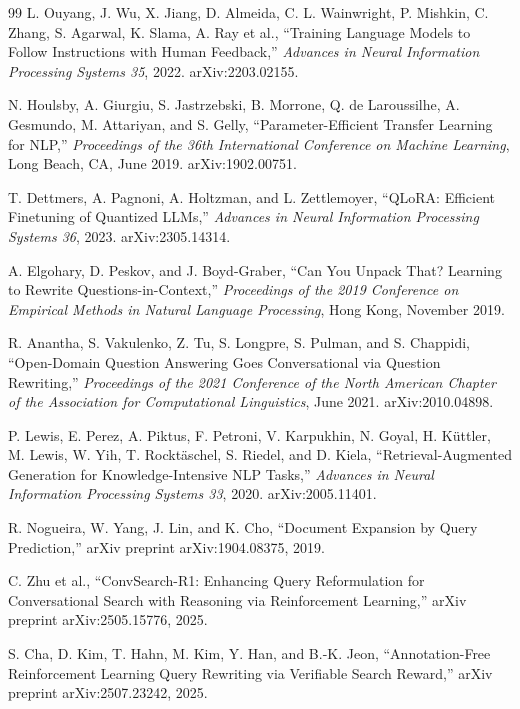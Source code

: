 \documentclass[12pt,letterpaper,oneside]{report}
\begin{document}
\begin{thebibliography}{99}
 L. Ouyang, J. Wu, X. Jiang, D. Almeida,
C. L. Wainwright, P. Mishkin, C. Zhang, S. Agarwal, K. Slama, A. Ray et al.,
``Training Language Models to Follow Instructions with Human Feedback,''
\emph{Advances in Neural Information Processing Systems 35}, 2022.
arXiv:2203.02155.

 N. Houlsby, A. Giurgiu, S. Jastrzebski,
B. Morrone, Q. de Laroussilhe, A. Gesmundo, M. Attariyan, and S. Gelly,
``Parameter-Efficient Transfer Learning for NLP,'' \emph{Proceedings of the
36th International Conference on Machine Learning}, Long Beach, CA, June 2019.
arXiv:1902.00751.

 T. Dettmers, A. Pagnoni, A. Holtzman, and
L. Zettlemoyer, ``QLoRA: Efficient Finetuning of Quantized LLMs,''
\emph{Advances in Neural Information Processing Systems 36}, 2023.
arXiv:2305.14314.

 A. Elgohary, D. Peskov, and J. Boyd-Graber,
``Can You Unpack That? Learning to Rewrite Questions-in-Context,''
\emph{Proceedings of the 2019 Conference on Empirical Methods in Natural
Language Processing}, Hong Kong, November 2019.

 R. Anantha, S. Vakulenko, Z. Tu, S. Longpre,
S. Pulman, and S. Chappidi, ``Open-Domain Question Answering Goes
Conversational via Question Rewriting,'' \emph{Proceedings of the 2021
Conference of the North American Chapter of the Association for Computational
Linguistics}, June 2021. arXiv:2010.04898.

 P. Lewis, E. Perez, A. Piktus, F. Petroni,
V. Karpukhin, N. Goyal, H. K\"{u}ttler, M. Lewis, W. Yih, T. Rockt\"{a}schel,
S. Riedel, and D. Kiela, ``Retrieval-Augmented Generation for
Knowledge-Intensive NLP Tasks,'' \emph{Advances in Neural Information
Processing Systems 33}, 2020. arXiv:2005.11401.

 R. Nogueira, W. Yang, J. Lin, and K. Cho,
``Document Expansion by Query Prediction,'' arXiv preprint arXiv:1904.08375,
2019.

 C. Zhu et al., ``ConvSearch-R1:
Enhancing Query Reformulation for Conversational Search with Reasoning via
Reinforcement Learning,'' arXiv preprint arXiv:2505.15776, 2025.

 S. Cha, D. Kim, T. Hahn, M. Kim, Y. Han, and
B.-K. Jeon, ``Annotation-Free Reinforcement Learning Query Rewriting via
Verifiable Search Reward,'' arXiv preprint arXiv:2507.23242, 2025.


\end{thebibliography}
\end{document}
